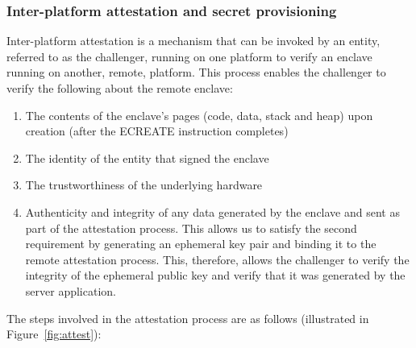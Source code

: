 \documentclass[../main.tex]{subfiles}
\begin{document}
\subsubsection{Inter-platform attestation and secret provisioning}

Inter-platform attestation is a mechanism that can be invoked by an
entity, referred to as the challenger, running on one platform to
verify an enclave running on another, remote, platform. This process
enables the challenger to verify the following about the remote
enclave:
\begin{enumerate}
  \item The contents of the enclave's pages (code, data, stack and heap)
    upon creation (after the ECREATE instruction completes)
  \item The identity of the entity that signed the enclave
  \item The trustworthiness of the underlying hardware
  \item Authenticity and integrity of any data generated by the enclave
    and sent as part of the attestation process. This allows us to
    satisfy the second requirement by generating an ephemeral key pair
    and binding it to the remote attestation process. This, therefore,
    allows the challenger to verify the integrity of the ephemeral
    public key and verify that it was generated by the server
    application.
\end{enumerate}
The steps involved in the attestation process are as follows
(illustrated in Figure~\ref{fig:attest}):
\end{document}
